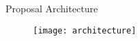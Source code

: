 \begin{frame}{Proposal Architecture}
  \begin{figure}
    \centering
    \texttt{[image: architecture]}
  \end{figure}
\end{frame}